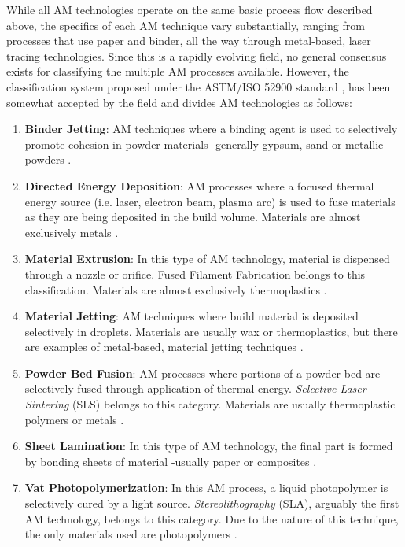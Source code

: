 \documentclass[main.tex]{subfiles}
\begin{document}
While all AM technologies operate on the same basic process flow described above, the specifics of each AM technique vary substantially, ranging from processes that use paper and binder, all the way through metal-based, laser tracing technologies. Since this is a rapidly evolving field, no general consensus exists for classifying the multiple AM processes available. However, the classification system proposed under the ASTM/ISO 52900 standard \cite{ASTM52900}, has been somewhat accepted by the field and divides AM technologies as follows:
\begin{enumerate}
	\item \textbf{Binder Jetting}: AM techniques where a binding agent is used to selectively promote cohesion in powder materials -generally gypsum, sand or metallic powders \cite{3DHubs2018}.
	\item \textbf{Directed Energy Deposition}: AM processes where a focused thermal energy source (i.e. laser, electron beam, plasma arc) is used to fuse materials as they are being deposited in the build volume. Materials are almost exclusively metals \cite{ASTM52900,3DHubs2018}.
	\item \textbf{Material Extrusion}: In this type of AM technology, material is dispensed through a nozzle or orifice. Fused Filament Fabrication belongs to this classification. Materials are almost exclusively thermoplastics \cite{ASTM52900,3DHubs2018}.
	\item \textbf{Material Jetting}: AM techniques where build material is deposited selectively in droplets. Materials are usually wax or thermoplastics, but there are examples of metal-based, material jetting techniques \cite{ASTM52900,3DHubs2018}.
	\item \textbf{Powder Bed Fusion}: AM processes where portions of a powder bed are selectively fused through application of thermal energy. \emph{Selective Laser Sintering} (SLS) belongs to this category. Materials are usually thermoplastic polymers or metals \cite{ASTM52900,3DHubs2018}. 
	\item \textbf{Sheet Lamination}: In this type of AM technology, the final part is formed by bonding sheets of material -usually paper or composites \cite{ASTM52900,3DHubs2018}. 
	\item \textbf{Vat Photopolymerization}: In this AM process, a liquid photopolymer is selectively cured by a light source. \emph{Stereolithography} (SLA), arguably the first AM technology, belongs to this category. Due to the nature of this technique, the only materials used are photopolymers \cite{ASTM52900,3DHubs2018}.
\end{enumerate} 
\end{document}
